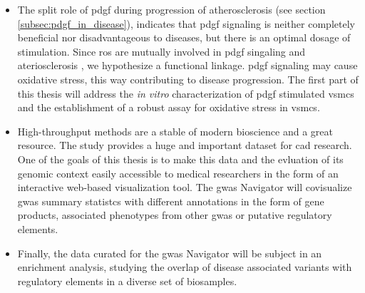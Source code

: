 \begin{itemize}
    \item The split role of \ac{pdgf} during progression of atherosclerosis (see section \ref{subsec:pdgf_in_disease}), indicates that \ac{pdgf} signaling is neither completely beneficial nor disadvantageous to diseases, but there is an optimal dosage of stimulation. Since \ac{ros} are mutually involved in \ac{pdgf} singaling \cite{sundaresanRequirementGenerationH2O21995, bouziguesRegulationROSResponse2014a} and ateriosclerosis \cite{burtenshawReactiveOxygenSpecies2019}, we hypothesize a functional linkage. \ac{pdgf} signaling may cause oxidative stress, this way contributing to disease progression. The first part of this thesis will address the \textit{in vitro} characterization of \ac{pdgf} stimulated \acp{vsmc} and the establishment of a robust assay for oxidative stress in \acp{vsmc}.
    \item High-throughput methods are a stable of modern bioscience and a great resource. The study \textcite{aragamDiscoverySystematicCharacterization2021} provides a huge and important dataset for \ac{cad} research. One of the goals of this thesis is to make this data and the evluation of its genomic context easily accessible to medical researchers in the form of an interactive web-based visualization tool. The \ac{gwas} Navigator will covisualize \ac{gwas} summary statistcs with different annotations in the form of gene products, associated phenotypes from other \ac{gwas} or putative regulatory elements.
    \item Finally, the data curated for the \ac{gwas} Navigator will be subject in an enrichment analysis, studying the overlap of disease associated variants with regulatory elements in a diverse set of biosamples.
\end{itemize}
